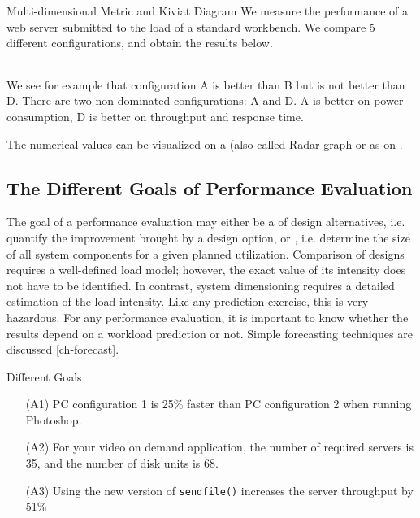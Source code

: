 \begin{ex}{Multi-dimensional Metric and Kiviat Diagram}
We measure the performance of a web server
submitted to the load of a standard workbench. We
compare 5 different configurations, and obtain
the results below.
  \begin{center}
  \begin{tabular}{|c|c|c|c|}
    \hline
    
  \end{tabular}
  \end{center}
We see for example that configuration A is better
than B but is not better than D. There are two
non dominated configurations: A and D. A is
better on power consumption, D is better on
throughput and response time.

The numerical values can be visualized on a
 (also called Radar graph or
 as on
.\label{ex-kiviat}
\end{ex}
\begin{figure}
  \label{fig-multidim}
\end{figure}

\subsection{The Different Goals of Performance Evaluation}

The goal of a performance evaluation may either be a 
of design alternatives, i.e. quantify the improvement brought by a
design option, or , i.e. determine the size
of all system components for a given planned utilization. Comparison
of designs requires a well-defined load model; however, the exact
value of its intensity does not have to be identified. In contrast,
system dimensioning requires a detailed estimation of the load
intensity. Like any prediction exercise, this is very hazardous. For
any performance evaluation, it is important to know whether the
results depend on a workload prediction or not. Simple forecasting
techniques are discussed \cref{ch-forecast}.

\begin{ex}{Different Goals}
\begin{itemize}
  \item[(A1)] PC configuration 1 is 25\% faster than PC configuration 2
  when running Photoshop.
  \item[(A2)] For your video on demand application, the number of required servers is 35,
   and the number of disk units is $68$.
  \item[(A3)] Using the new version of \texttt{sendfile()} increases the server throughput by 51\%
\end{itemize}
\end{ex}

